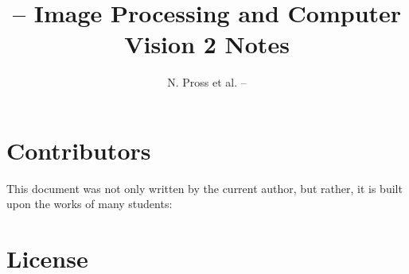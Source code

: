 \documentclass[margin=small]{tex/hsrzf}
\author{N. Pross et al. -- \texttt{\theauthoremail}}
\title{\texttt{\themodule} -- Image Processing and Computer Vision 2 Notes}
\date{\thesemester}
\begin{document}

\maketitle


\section*{Contributors}

This document was not only written by the current author, but rather, it is built upon the works of many students: \thecontributors

\section*{License}
\doclicenseThis


\tableofcontents

\twocolumn
\clearpage
\setcounter{page}{1}


\newcommand{\textbook}[1]{~\footnotesize\textcolor{red!60!black}{\texttt{#1}}}


% 
% 
% 
% 
\end{document}
